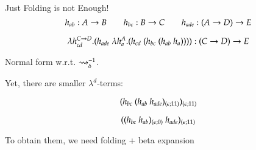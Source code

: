 \documentclass[9pt]{beamer}
\newcommand{\mypause}{\pause}
\begin{document}
\begin{frame}{Just Folding is not Enough!}
$$
h_{ab}: A \rightarrow B \qquad h_{bc} : B \rightarrow C \qquad h_{ade} : (A \rightarrow D) \rightarrow E
$$

\medskip
\medskip

$$
\lambda h_{cd}^{C \rightarrow D}. (h_{ade} \ \lambda h_a^A.(h_{cd} \ (h_{bc} \ (h_{ab} \ h_a))))  :  (C \rightarrow D) \rightarrow E
$$

\medskip

\mypause

\begin{center}
\alert{Normal form w.r.t. $\rightsquigarrow_{\delta}^{-1}$.}

\mypause

Yet, there are smaller $\lambda^d$-terms:
\end{center}

$$
(h_{bc} \ (h_{ab} \ h_{ade})_{(\eS ; 11)})_{(\eS ; 11)}  %
$$

$$
((h_{bc} \ h_{ab})_{(\eS ; 0)} \ h_{ade})_{(\eS ; 11)}  %
$$

\medskip
\medskip

\mypause

\begin{center}
To obtain them, we need \alert{folding + beta expansion}
\end{center}
\end{frame}
\end{document}
